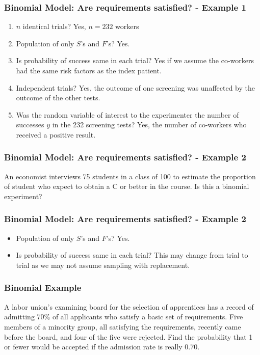 \documentclass[xcolor=dvipsnames,12pt]{beamer}
\begin{document}
\begin{frame}
\frametitle{Binomial Model: Are requirements satisfied? - Example 1}
\begin{enumerate}
\item $n$ identical trials? Yes, $n=232$ workers
\item  Population of only $S$'s and $F$'s?   Yes.
\item Is probability of success same in each trial? Yes if we assume the co-workers had the same risk factors as the index patient.
\item Independent trials? Yes, the outcome of one screening was unaffected by the outcome of the other tests.
\item Was the random variable of interest to the experimenter the number of successes $y$ in the 232 screening tests? Yes, the number of co-workers who received a positive result.
\end{enumerate}
\end{frame}


\begin{frame}
\frametitle{Binomial Model: Are requirements satisfied? - Example 2}
An economist interviews 75 students in a class of 100 to estimate the proportion of student who expect to obtain a C or better in the course. Is this a binomial experiment?
\end{frame}

\begin{frame}
\frametitle{Binomial Model: Are requirements satisfied? - Example 2}
\begin{itemize}
\item  Population of only $S$'s and $F$'s?   Yes.
\item Is probability of success same in each trial? This may change
from trial to trial as we may not assume sampling with replacement.
\end{itemize}
\end{frame}



\begin{frame}
\frametitle{Binomial Example}
 A labor union's examining board for the selection of apprentices
has a record of admitting 70\% of all applicants who satisfy
a basic set of requirements.  Five members of a minority group,
all satisfying the requirements, recently came before the board,
and four of the five were rejected.  Find the probability that
1 or fewer would be accepted if the admission rate is really
0.70.
\end{frame}
\end{document}

